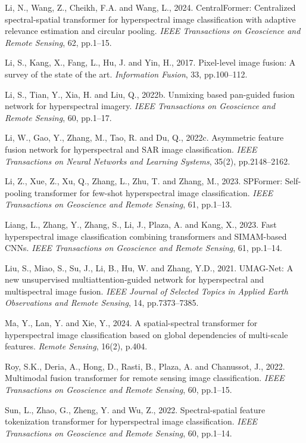 \documentclass[pdflatex,sn-mathphys-num]{sn-jnl}
\begin{document}
\begin{thebibliography}{}
Li, N., Wang, Z., Cheikh, F.A. and Wang, L., 2024.
CentralFormer: Centralized spectral-spatial transformer for hyperspectral image classification with adaptive relevance estimation and circular pooling.
\textit{IEEE Transactions on Geoscience and Remote Sensing}, 62, pp.1--15.

Li, S., Kang, X., Fang, L., Hu, J. and Yin, H., 2017.
Pixel-level image fusion: A survey of the state of the art.
\textit{Information Fusion}, 33, pp.100--112.

Li, S., Tian, Y., Xia, H. and Liu, Q., 2022b.
Unmixing based pan-guided fusion network for hyperspectral imagery.
\textit{IEEE Transactions on Geoscience and Remote Sensing}, 60, pp.1--17.

Li, W., Gao, Y., Zhang, M., Tao, R. and Du, Q., 2022c.
Asymmetric feature fusion network for hyperspectral and SAR image classification.
\textit{IEEE Transactions on Neural Networks and Learning Systems}, 35(2), pp.2148--2162.

Li, Z., Xue, Z., Xu, Q., Zhang, L., Zhu, T. and Zhang, M., 2023.
SPFormer: Self-pooling transformer for few-shot hyperspectral image classification.
\textit{IEEE Transactions on Geoscience and Remote Sensing}, 61, pp.1--13.

Liang, L., Zhang, Y., Zhang, S., Li, J., Plaza, A. and Kang, X., 2023.
Fast hyperspectral image classification combining transformers and SIMAM-based CNNs.
\textit{IEEE Transactions on Geoscience and Remote Sensing}, 61, pp.1--14.

Liu, S., Miao, S., Su, J., Li, B., Hu, W. and Zhang, Y.D., 2021.
UMAG-Net: A new unsupervised multiattention-guided network for hyperspectral and multispectral image fusion.
\textit{IEEE Journal of Selected Topics in Applied Earth Observations and Remote Sensing}, 14, pp.7373--7385.

Ma, Y., Lan, Y. and Xie, Y., 2024.
A spatial-spectral transformer for hyperspectral image classification based on global dependencies of multi-scale features.
\textit{Remote Sensing}, 16(2), p.404.

Roy, S.K., Deria, A., Hong, D., Rasti, B., Plaza, A. and Chanussot, J., 2022.
Multimodal fusion transformer for remote sensing image classification.
\textit{IEEE Transactions on Geoscience and Remote Sensing}, 60, pp.1--15.

Sun, L., Zhao, G., Zheng, Y. and Wu, Z., 2022.
Spectral-spatial feature tokenization transformer for hyperspectral image classification.
\textit{IEEE Transactions on Geoscience and Remote Sensing}, 60, pp.1--14.


\end{thebibliography}
\end{document}
